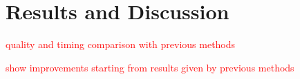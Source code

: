 \section{Results and Discussion}

\textcolor{red}{quality and timing comparison with previous methods}

\textcolor{red}{show improvements starting from results given by previous methods}